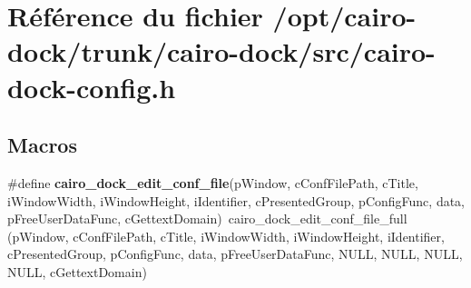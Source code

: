 \section{Référence du fichier /opt/cairo-dock/trunk/cairo-dock/src/cairo-dock-config.h}
\label{cairo-dock-config_8h}
\subsection*{Macros}
\begin{CompactItemize}
\item 
\#define {\bf cairo\_\-dock\_\-edit\_\-conf\_\-file}(pWindow, cConfFilePath, cTitle, iWindowWidth, iWindowHeight, iIdentifier, cPresentedGroup, pConfigFunc, data, pFreeUserDataFunc, cGettextDomain)~cairo\_\-dock\_\-edit\_\-conf\_\-file\_\-full (pWindow, cConfFilePath, cTitle, iWindowWidth, iWindowHeight, iIdentifier, cPresentedGroup, pConfigFunc, data, pFreeUserDataFunc, NULL, NULL, NULL, NULL, cGettextDomain)
\end{CompactItemize}
